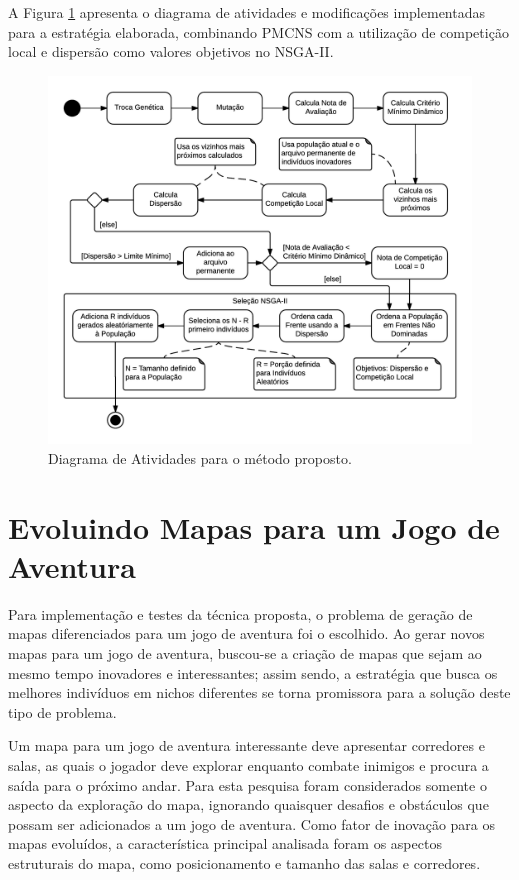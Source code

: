 A Figura \ref{fig:dev_activity_diagram} apresenta o diagrama de atividades e modificações implementadas para a estratégia elaborada, combinando PMCNS com a utilização de competição local e dispersão como valores objetivos no NSGA-II.

\begin{figure}[htb]
	\begin{center}
		\includegraphics[width=1.0\textwidth]{Imagens/dev_activity_diagram.png}
		\caption{Diagrama de Atividades para o método proposto.}
		\label{fig:dev_activity_diagram}
	\end{center}
\end{figure}

\section{Evoluindo Mapas para um Jogo de Aventura}

Para implementação e testes da técnica proposta, o problema de geração de mapas diferenciados para um jogo de aventura foi o escolhido. Ao gerar novos mapas para um jogo de aventura, buscou-se a criação de mapas que sejam ao mesmo tempo inovadores e interessantes; assim sendo, a estratégia que busca os melhores indivíduos em nichos diferentes se torna promissora para a solução deste tipo de problema.

Um mapa para um jogo de aventura interessante deve apresentar corredores e salas, as quais o jogador deve explorar enquanto combate inimigos e procura a saída para o próximo andar. Para esta pesquisa foram considerados somente o aspecto da exploração do mapa, ignorando quaisquer desafios e obstáculos que possam ser adicionados a um jogo de aventura. Como fator de inovação para os mapas evoluídos, a característica principal analisada foram os aspectos estruturais do mapa, como posicionamento e tamanho das salas e corredores.

